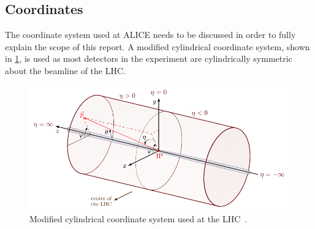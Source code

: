 \subsection{Coordinates}
The coordinate system used at ALICE needs to be discussed in order to fully explain the scope of this report. A modified cylindrical coordinate system, shown in \cref{fig:coords}, is used as most detectors in the experiment are cylindrically symmetric about the beamline of the LHC. 

\begin{figure}[h]
    \begin{center}
        \includegraphics[width=.8\textwidth]{Figs/coords.pdf}
        \caption[Modified cylindrical coordinate system used at the LHC]{Modified cylindrical coordinate system used at the LHC~\cite{coords}.}
        \label{fig:coords}
    \end{center}
\end{figure}

